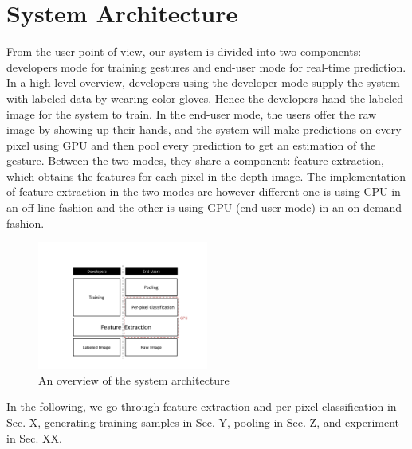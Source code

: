 \section{System Architecture}

From the user point of view, our system is divided into two components: developers mode for training gestures and end-user mode for real-time prediction. In a high-level overview, developers using the developer mode supply the system with labeled data by wearing color gloves. Hence the developers hand the labeled image for the system to train. In the end-user mode, the users offer the raw image by showing up their hands, and the system will make predictions on every pixel using GPU and then pool every prediction to get an estimation of the gesture. Between the two modes, they share a component: feature extraction, which obtains the features for each pixel in the depth image. The implementation of feature extraction in the two modes are however different one is using CPU in an off-line fashion and the other is using GPU (end-user mode) in an on-demand fashion. 




\begin{figure}
\centering
	\includegraphics[width=0.5\textwidth]{fig/SystemArchitecture.pdf}
	\caption{An overview of the system architecture}
\label{fig: architecture}
\end{figure}

In the following, we go through feature extraction and per-pixel classification in Sec. X, generating training samples in Sec. Y, pooling in Sec. Z, and experiment in Sec. XX.